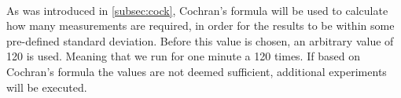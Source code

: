 \paragraph*{}
As was introduced in \cref{subsec:cock}, Cochran's formula will be used to calculate how many measurements are required, in order for the results to be within some pre-defined standard deviation. Before this value is chosen, an arbitrary value of 120 is used. Meaning that we run for one minute a 120 times. 
If based on Cochran's formula the values are not deemed sufficient, additional experiments will be executed.



